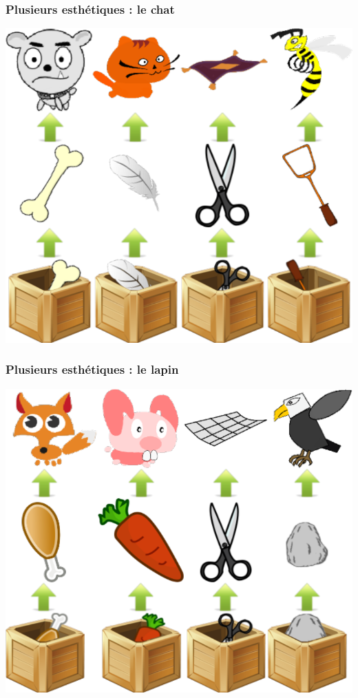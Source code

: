 \documentclass{beamer}
\begin{document}
\begin{frame}
\frametitle{Plusieurs esthétiques : le chat}
\begin{center}
\includegraphics[scale=0.23]{images/esthetique.png}
\end{center}
\end{frame}

\begin{frame}
\frametitle{Plusieurs esthétiques : le lapin}
\begin{center}
\includegraphics[scale=0.23]{images/esthetique1.png}
\end{center}
\end{frame}
\end{document}
